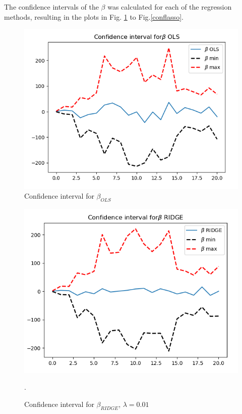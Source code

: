 \documentclass[a4paper,11pt,twocolumn]{article}
\begin{document}
The confidence intervals of the $\beta$ was calculated for each of the regression methods, resulting in the plots in Fig. \ref{confols} to Fig.\ref{conflasso}.

\begin{figure}[h]
\centering
\includegraphics[scale=0.75]{confols}
\caption{Confidence interval for $\beta_{OLS}$}
\label{confols}
\end{figure}

\begin{figure}[h]
\centering
\includegraphics[scale=0.75]{confridge}
\caption{Confidence interval for $\beta_{RIDGE}$, $\lambda=0.01$}.
\label{confridge}
\end{figure}
\end{document}

